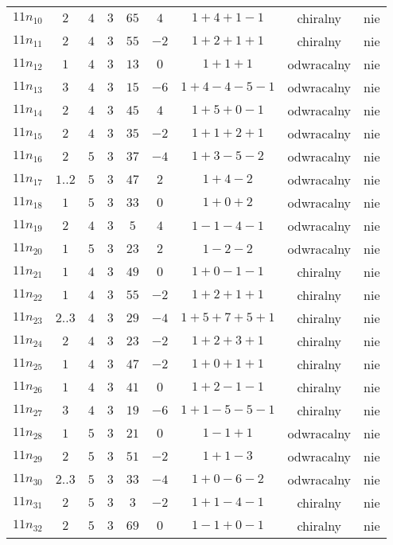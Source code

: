 \begin{longtable}{ccccccccc}
$11n_{10}$ & $2$ & $4$ & $3$ & $65$ & $4$ & $1+4+1-1$ & chiralny & nie \\
$11n_{11}$ & $2$ & $4$ & $3$ & $55$ & $-2$ & $1+2+1+1$ & chiralny & nie \\
$11n_{12}$ & $1$ & $4$ & $3$ & $13$ & $0$ & $1+1+1$ & odwracalny & nie \\
$11n_{13}$ & $3$ & $4$ & $3$ & $15$ & $-6$ & $1+4-4-5-1$ & odwracalny & nie \\
$11n_{14}$ & $2$ & $4$ & $3$ & $45$ & $4$ & $1+5+0-1$ & odwracalny & nie \\
$11n_{15}$ & $2$ & $4$ & $3$ & $35$ & $-2$ & $1+1+2+1$ & odwracalny & nie \\
$11n_{16}$ & $2$ & $5$ & $3$ & $37$ & $-4$ & $1+3-5-2$ & odwracalny & nie \\
$11n_{17}$ & $1..2$ & $5$ & $3$ & $47$ & $2$ & $1+4-2$ & odwracalny & nie \\
$11n_{18}$ & $1$ & $5$ & $3$ & $33$ & $0$ & $1+0+2$ & odwracalny & nie \\
$11n_{19}$ & $2$ & $4$ & $3$ & $5$ & $4$ & $1-1-4-1$ & odwracalny & nie \\
$11n_{20}$ & $1$ & $5$ & $3$ & $23$ & $2$ & $1-2-2$ & odwracalny & nie \\
$11n_{21}$ & $1$ & $4$ & $3$ & $49$ & $0$ & $1+0-1-1$ & chiralny & nie \\
$11n_{22}$ & $1$ & $4$ & $3$ & $55$ & $-2$ & $1+2+1+1$ & chiralny & nie \\
$11n_{23}$ & $2..3$ & $4$ & $3$ & $29$ & $-4$ & $1+5+7+5+1$ & chiralny & nie \\
$11n_{24}$ & $2$ & $4$ & $3$ & $23$ & $-2$ & $1+2+3+1$ & chiralny & nie \\
$11n_{25}$ & $1$ & $4$ & $3$ & $47$ & $-2$ & $1+0+1+1$ & chiralny & nie \\
$11n_{26}$ & $1$ & $4$ & $3$ & $41$ & $0$ & $1+2-1-1$ & chiralny & nie \\
$11n_{27}$ & $3$ & $4$ & $3$ & $19$ & $-6$ & $1+1-5-5-1$ & chiralny & nie \\
$11n_{28}$ & $1$ & $5$ & $3$ & $21$ & $0$ & $1-1+1$ & odwracalny & nie \\
$11n_{29}$ & $2$ & $5$ & $3$ & $51$ & $-2$ & $1+1-3$ & odwracalny & nie \\
$11n_{30}$ & $2..3$ & $5$ & $3$ & $33$ & $-4$ & $1+0-6-2$ & odwracalny & nie \\
$11n_{31}$ & $2$ & $5$ & $3$ & $3$ & $-2$ & $1+1-4-1$ & chiralny & nie \\
$11n_{32}$ & $2$ & $5$ & $3$ & $69$ & $0$ & $1-1+0-1$ & chiralny & nie \\

\end{longtable}
